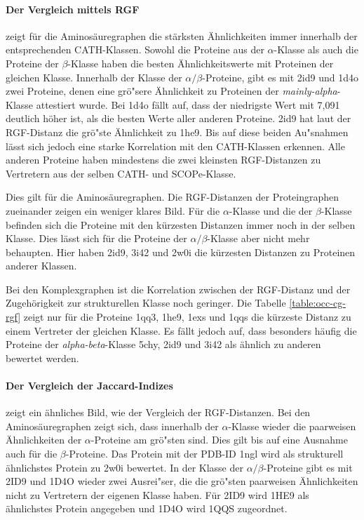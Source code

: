 \documentclass{report}
\begin{document}
\paragraph{Der Vergleich mittels RGF}
zeigt f\"ur die Aminos\"auregraphen die st\"arksten \"Ahnlichkeiten immer innerhalb der entsprechenden CATH-Klassen. Sowohl die Proteine aus der $\alpha$-Klasse als auch die Proteine der $\beta$-Klasse haben die besten \"Ahnlichkeitswerte mit Proteinen der gleichen Klasse.
Innerhalb der Klasse der $\alpha/\beta$-Proteine, gibt es mit 2id9 und 1d4o zwei Proteine, denen eine gr\"o"sere \"Ahnlichkeit zu Proteinen der \textit{mainly-alpha}-Klasse attestiert wurde.
Bei 1d4o f\"allt auf, dass der niedrigste Wert mit 7,091 deutlich h\"oher ist, als die besten Werte aller anderen Proteine.
2id9 hat laut der RGF-Distanz die gr\"o"ste \"Ahnlichkeit zu 1he9.
Bis auf diese beiden Au"snahmen l\"asst sich jedoch eine starke Korrelation mit den CATH-Klassen erkennen.
Alle anderen Proteine haben mindestens die zwei kleinsten RGF-Distanzen zu Vertretern aus der selben CATH- und SCOPe-Klasse.

Dies gilt f\"ur die Aminos\"auregraphen. Die RGF-Distanzen der Proteingraphen zueinander zeigen ein weniger klares Bild.
F\"ur die $\alpha$-Klasse und die der $\beta$-Klasse befinden sich die Proteine mit den k\"urzesten Distanzen immer noch in der selben Klasse. Dies l\"asst sich f\"ur die Proteine der $\alpha/\beta$-Klasse aber nicht mehr behaupten. Hier haben 2id9, 3i42 und 2w0i die k\"urzesten Distanzen zu Proteinen anderer Klassen.

Bei den Komplexgraphen ist die Korrelation zwischen der RGF-Distanz und der Zugeh\"origkeit zur strukturellen Klasse noch geringer. Die Tabelle \ref{table:occ-cg-rgf} zeigt nur f\"ur die Proteine 1qq3, 1he9, 1exs und 1qqs die k\"urzeste Distanz zu einem Vertreter der gleichen Klasse.
Es f\"allt jedoch auf, dass besonders h\"aufig die Proteine der \textit{alpha-beta}-Klasse 5chy, 2id9 und 3i42 als \"ahnlich zu anderen bewertet werden.

\paragraph{Der Vergleich der Jaccard-Indizes}
zeigt ein \"ahnliches Bild, wie der Vergleich der RGF-Distanzen. Bei den Aminos\"auregraphen zeigt sich, dass innerhalb der $\alpha$-Klasse wieder die paarweisen \"Ahnlichkeiten der $\alpha$-Proteine am gr\"o"sten sind. Dies gilt bis auf eine Ausnahme auch f\"ur die $\beta$-Proteine. Das Protein mit der PDB-ID 1ngl wird als strukturell \"ahnlichstes Protein zu 2w0i bewertet. In der Klasse der $\alpha/\beta$-Proteine gibt es mit 2ID9 und 1D4O wieder zwei Ausrei"ser, die die gr\"o"sten paarweisen \"Ahnlichkeiten nicht zu Vertretern der eigenen Klasse haben. F\"ur 2ID9 wird 1HE9 als \"ahnlichstes Protein angegeben und 1D4O wird 1QQS zugeordnet.
\end{document}
